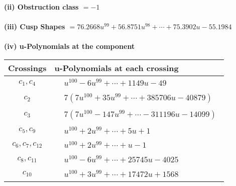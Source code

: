 \documentclass[1p]{elsarticle_modified}
\theoremstyle{definition}
\begin{document}
\flushleft \textbf{(ii) Obstruction class $= -1$}\\~\\
\flushleft \textbf{(iii) Cusp Shapes $= 76.2668 u^{99}+56.8751 u^{98}+\cdots+75.3902 u-55.1984$}\\~\\
\newpage\renewcommand{\arraystretch}{1}
\flushleft \textbf{(iv) u-Polynomials at the component}\newline \\
\begin{tabular}{m{50pt}|m{274pt}}
Crossings & \hspace{64pt}u-Polynomials at each crossing \\
\hline $$\begin{aligned}c_{1},c_{4}\end{aligned}$$&$\begin{aligned}
&u^{100}-6 u^{99}+\cdots+1149 u-49
\end{aligned}$\\
\hline $$\begin{aligned}c_{2}\end{aligned}$$&$\begin{aligned}
&7(7 u^{100}+35 u^{99}+\cdots+385706 u-40879)
\end{aligned}$\\
\hline $$\begin{aligned}c_{3}\end{aligned}$$&$\begin{aligned}
&7(7 u^{100}-147 u^{99}+\cdots-311196 u-14099)
\end{aligned}$\\
\hline $$\begin{aligned}c_{5},c_{9}\end{aligned}$$&$\begin{aligned}
&u^{100}+2 u^{99}+\cdots+5 u+1
\end{aligned}$\\
\hline $$\begin{aligned}c_{6},c_{7},c_{12}\end{aligned}$$&$\begin{aligned}
&u^{100}+2 u^{99}+\cdots+u-1
\end{aligned}$\\
\hline $$\begin{aligned}c_{8},c_{11}\end{aligned}$$&$\begin{aligned}
&u^{100}-6 u^{99}+\cdots+25745 u-4025
\end{aligned}$\\
\hline $$\begin{aligned}c_{10}\end{aligned}$$&$\begin{aligned}
&u^{100}+3 u^{99}+\cdots+17472 u+1568
\end{aligned}$\\
\hline
\end{tabular}\\~\\
\end{document}

